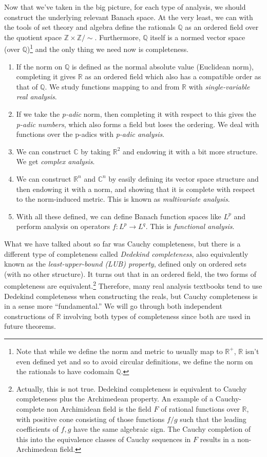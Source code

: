 Now that we've taken in the big picture, for each type of analysis, we should construct the underlying relevant Banach space. At the very least, we can with the tools of set theory and algebra define the rationals $\mathbb{Q}$ as an ordered field over the quotient space $\mathbb{Z} \times \mathbb{Z} / \sim$. Furthermore, $\mathbb{Q}$ itself is a normed vector space (over $\mathbb{Q}$)\footnote{Note that while we define the norm and metric to usually map to $\mathbb{R}^+$, $\mathbb{R}$ isn't even defined yet and so to avoid circular definitions, we define the norm on the rationals to have codomain $\mathbb{Q}$. } and the only thing we need now is completeness. 
\begin{enumerate}
  \item If the norm on $\mathbb{Q}$ is defined as the normal absolute value (Euclidean norm), completing it gives $\mathbb{R}$ as an ordered field which also has a compatible order as that of $\mathbb{Q}$. We study functions mapping to and from $\mathbb{R}$ with \textit{single-variable real analysis}. 
  \item If we take the \textit{p-adic} norm, then completing it with respect to this gives the \textit{p-adic numbers}, which also forms a field but loses the ordering. We deal with functions over the p-adics with \textit{p-adic analysis}. 
  \item We can construct $\mathbb{C}$ by taking $\mathbb{R}^2$ and endowing it with a bit more structure. We get \textit{complex analysis}. 
  \item We can construct $\mathbb{R}^n$ and $\mathbb{C}^n$ by easily defining its vector space structure and then endowing it with a norm, and showing that it is complete with respect to the norm-induced metric. This is known as \textit{multivariate analysis}. 
  \item With all these defined, we can define Banach function spaces like $L^p$ and perform analysis on operators $f: L^p \rightarrow L^q$. This is \textit{functional analysis}. 
\end{enumerate}
What we have talked about so far was Cauchy completeness, but there is a different type of completeness called \textit{Dedekind completeness}, also equivalently known as the \textit{least-upper-bound (LUB) property}, defined only on ordered sets (with no other structure). It turns out that in an ordered field, the two forms of completeness are equivalent.\footnote{Actually, this is not true. Dedekind completeness is equivalent to Cauchy completeness plus the Archimedean property. An example of a Cauchy-complete non Archimidean field is the field $F$ of rational functions over $\mathbb{R}$, with positive cone consisting of those functions $f/g$ such that the leading coefficients of $f, g$ have the same algebraic sign. The Cauchy completion of this into the equivalence classes of Cauchy sequences in $F$ results in a non-Archimedean field. } Therefore, many real analysis textbooks tend to use Dedekind completeness when constructing the reals, but Cauchy completeness is in a sense more ``fundamental.'' We will go through both independent constructions of $\mathbb{R}$ involving both types of completeness since both are used in future theorems. 

